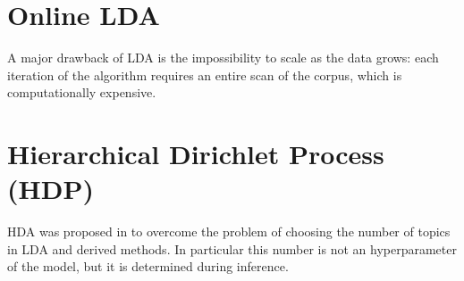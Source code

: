 \section{Online LDA}
A major drawback of LDA is the impossibility to scale as the data grows:
each iteration of the algorithm requires an entire scan of the corpus, which is computationally expensive.

\section{Hierarchical Dirichlet Process (HDP)}
HDA was proposed in \cite{DBLP:journals/jmlr/WangPB11} to overcome the problem of choosing the number of topics in LDA and derived methods.
In particular this number is not an hyperparameter of the model, but it is determined during inference.
